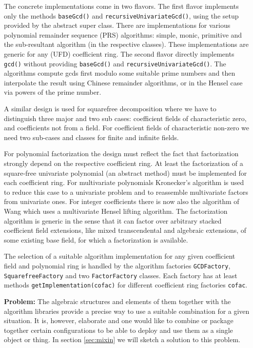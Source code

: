 \documentclass{llncs}
\newcommand{\code}[1]{\texttt{#1}}
\begin{document}
The concrete implementations come in two flavors.  The first flavor
implements only the methods \code{base\-Gcd()} and
\code{recursive\-Univariate\-Gcd()}, using the setup provided by the
abstract super class.  There are implementations for various
polynomial remainder sequence (PRS) algorithms: simple, monic,
primitive and the sub-resultant algorithm (in the respective classes).
These implementations are generic for any (UFD) coefficient ring.  The
second flavor directly implements \code{gcd()} without providing
\code{base\-Gcd()} and \code{recursive\-Univariate\-Gcd()}.  The
algorithms compute gcds first modulo some suitable prime numbers and
then interpolate the result using Chinese remainder algorithms, or in
the Hensel case via powers of the prime number.  

A similar design is used for squarefree decomposition where we have to
distinguish three major and two sub cases: coefficient fields of
characteristic zero, and coefficients not from a field. For
coefficient fields of characteristic non-zero we need two sub-cases
and classes for finite and infinite fields.

For polynomial factorization the design must reflect the fact that
factorization strongly depend on the respective coefficient ring.  At
least the factorization of a square-free univariate polynomial (an
abstract method) must be implemented for each coefficient ring.  For
multivariate polynomials Kronecker's algorithm is used to reduce this
case to a univariate problem and to reassemble multivariate factors
from univariate ones. For integer coefficients there is now also the
algorithm of Wang which uses a multivariate Hensel lifting algorithm.
The factorization algorithm is generic in the sense that it can factor
over arbitrary stacked coefficient field extensions, like mixed
transcendental and algebraic extensions, of some existing base field,
for which a factorization is available.

The selection of a suitable algorithm implementation for any given
coefficient field and polynomial ring is handled by the
algorithm factories \code{GCD\-Factory}, \code{Squarefree\-Factory} and
two \code{Factor\-Factory} classes. Each factory has at least methods
\code{get\-Implemen\-tation(cofac)} for different coefficient ring
factories \code{cofac}.

{\bf Problem:} The algebraic structures and elements of them together
with the algorithm libraries provide a precise way to use a suitable
combination for a given situation. It is, however, elaborate and one
would like to combine or package together certain configurations to be
able to deploy and use them as a single object or thing. In section
\ref{sec:mixin} we will sketch a solution to this problem.
\end{document}
